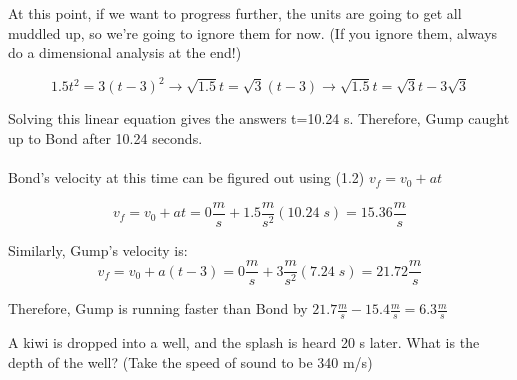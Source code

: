 \begin{solution}
At this point, if we want to progress further, the units are going to get all muddled up, so we're going to ignore them for now. (If you ignore them, always do a dimensional analysis at the end!)

\begin{equation*}
    1.5t^2 = 3(t-3)^2 \rightarrow
    \sqrt{1.5}t = \sqrt{3}(t-3) \rightarrow
    \sqrt{1.5}t = \sqrt{3}t-3\sqrt{3}
\end{equation*}

Solving this linear equation gives the answers t=10.24 s. Therefore, Gump caught up to Bond after 10.24 seconds.
\\\\ Bond's velocity at this time can be figured out using (1.2) $v_f=v_0+at$

\begin{equation*}
    v_f=v_0+at =
    0\frac{m}{s} + 1.5\frac{m}{s^2}(10.24\;s) =  
    15.36\frac{m}{s}
\end{equation*}

Similarly, Gump's velocity is:
\begin{equation*}
    v_f=v_0+a(t-3) = 
    0\frac{m}{s} + 3\frac{m}{s^2}(7.24\;s) =  
    21.72\frac{m}{s}
\end{equation*}

Therefore, Gump is running faster than Bond by $21.7\frac{m}{s}-15.4\frac{m}{s}=6.3\frac{m}{s}$

\end{solution}


\begin{question}
A kiwi is dropped into a well, and the splash is heard 20 s later. What is the depth of the well? (Take the speed of sound to be 340 m/s)
\end{question}

